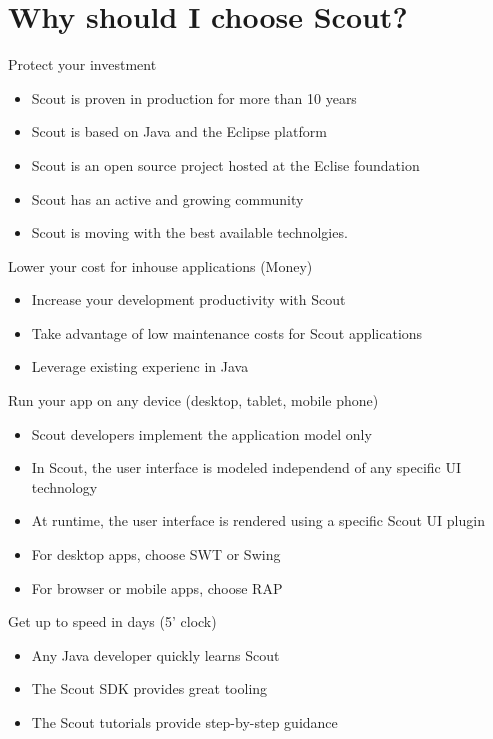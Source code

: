 \documentclass[a4paper,10pt,twoside]{book}
\begin{document}
\section{Why should I choose Scout?}

Protect your investment
\begin{itemize}
  \item Scout is proven in production for more than 10 years
  \item Scout is based on Java and the Eclipse platform
  \item Scout is an open source project hosted at the Eclise foundation
  \item Scout has an active and growing community
  \item Scout is moving with the best available technolgies.

\end{itemize}

Lower your cost for inhouse applications (Money)
\begin{itemize}
  \item Increase your development productivity with Scout
  \item Take advantage of low maintenance costs for Scout applications
  \item Leverage existing experienc in Java
\end{itemize}

Run your app on any device (desktop, tablet, mobile phone)
\begin{itemize}
  \item Scout developers implement the application model only
  \item In Scout, the user interface is modeled independend of any specific UI technology
  \item At runtime, the user interface is rendered using a specific Scout UI plugin
  \item For desktop apps, choose SWT or Swing
  \item For browser or mobile apps, choose RAP
\end{itemize}

Get up to speed in days (5' clock)
\begin{itemize}
  \item Any Java developer quickly learns Scout
  \item The Scout SDK provides great tooling
  \item The Scout tutorials provide step-by-step guidance
\end{itemize}
\end{document}
